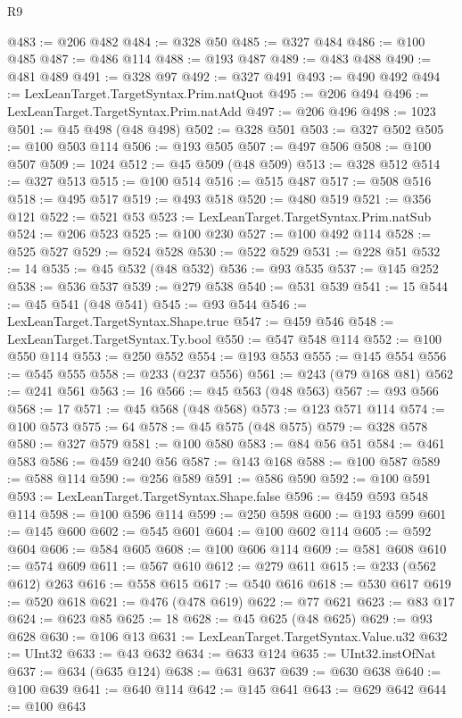 \begin{lexlean}{R9}
\begin{coremodule}
@483 := @206 @482
@484 := @328 @50
@485 := @327 @484
@486 := @100 @485
@487 := @486 @114
@488 := @193 @487
@489 := @483 @488
@490 := @481 @489
@491 := @328 @97
@492 := @327 @491
@493 := @490 @492
@494 := LexLeanTarget.TargetSyntax.Prim.natQuot
@495 := @206 @494
@496 := LexLeanTarget.TargetSyntax.Prim.natAdd
@497 := @206 @496
@498 := 1023
@501 := @45 @498 (@48 @498)
@502 := @328 @501
@503 := @327 @502
@505 := @100 @503 @114
@506 := @193 @505
@507 := @497 @506
@508 := @100 @507
@509 := 1024
@512 := @45 @509 (@48 @509)
@513 := @328 @512
@514 := @327 @513
@515 := @100 @514
@516 := @515 @487
@517 := @508 @516
@518 := @495 @517
@519 := @493 @518
@520 := @480 @519
@521 := @356 @121
@522 := @521 @53
@523 := LexLeanTarget.TargetSyntax.Prim.natSub
@524 := @206 @523
@525 := @100 @230
@527 := @100 @492 @114
@528 := @525 @527
@529 := @524 @528
@530 := @522 @529
@531 := @228 @51
@532 := 14
@535 := @45 @532 (@48 @532)
@536 := @93 @535
@537 := @145 @252
@538 := @536 @537
@539 := @279 @538
@540 := @531 @539
@541 := 15
@544 := @45 @541 (@48 @541)
@545 := @93 @544
@546 := LexLeanTarget.TargetSyntax.Shape.true
@547 := @459 @546
@548 := LexLeanTarget.TargetSyntax.Ty.bool
@550 := @547 @548 @114
@552 := @100 @550 @114
@553 := @250 @552
@554 := @193 @553
@555 := @145 @554
@556 := @545 @555
@558 := @233 (@237 @556)
@561 := @243 (@79 @168 @81)
@562 := @241 @561
@563 := 16
@566 := @45 @563 (@48 @563)
@567 := @93 @566
@568 := 17
@571 := @45 @568 (@48 @568)
@573 := @123 @571 @114
@574 := @100 @573
@575 := 64
@578 := @45 @575 (@48 @575)
@579 := @328 @578
@580 := @327 @579
@581 := @100 @580
@583 := @84 @56 @51
@584 := @461 @583
@586 := @459 @240 @56
@587 := @143 @168
@588 := @100 @587
@589 := @588 @114
@590 := @256 @589
@591 := @586 @590
@592 := @100 @591
@593 := LexLeanTarget.TargetSyntax.Shape.false
@596 := @459 @593 @548 @114
@598 := @100 @596 @114
@599 := @250 @598
@600 := @193 @599
@601 := @145 @600
@602 := @545 @601
@604 := @100 @602 @114
@605 := @592 @604
@606 := @584 @605
@608 := @100 @606 @114
@609 := @581 @608
@610 := @574 @609
@611 := @567 @610
@612 := @279 @611
@615 := @233 (@562 @612) @263
@616 := @558 @615
@617 := @540 @616
@618 := @530 @617
@619 := @520 @618
@621 := @476 (@478 @619)
@622 := @77 @621
@623 := @83 @17
@624 := @623 @85
@625 := 18
@628 := @45 @625 (@48 @625)
@629 := @93 @628
@630 := @106 @13
@631 := LexLeanTarget.TargetSyntax.Value.u32
@632 := UInt32
@633 := @43 @632
@634 := @633 @124
@635 := UInt32.instOfNat
@637 := @634 (@635 @124)
@638 := @631 @637
@639 := @630 @638
@640 := @100 @639
@641 := @640 @114
@642 := @145 @641
@643 := @629 @642
@644 := @100 @643

\end{coremodule}
\end{lexlean}
